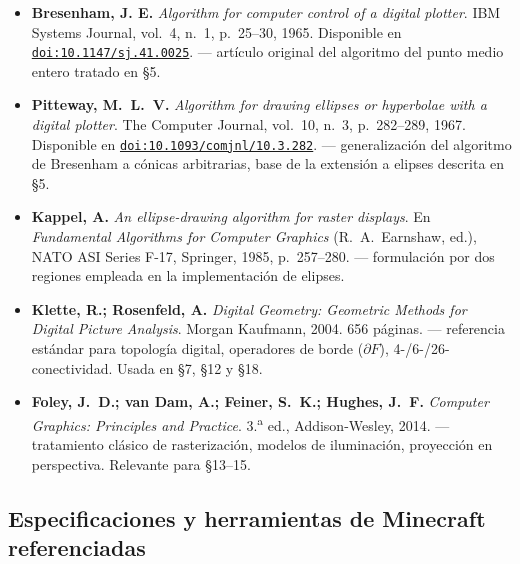 \documentclass[12pt,a4paper]{scrartcl}
\newcommand{\biblink}[2]{\href{#1}{\nolinkurl{#2}}}
\begin{document}
\begin{itemize}[leftmargin=1.4em,itemsep=0.3em,topsep=0.3em]
  \item \textbf{Bresenham, J. E.} \emph{Algorithm for computer control of a digital plotter}.
        IBM Systems Journal, vol.~4, n.~1, p.~25--30, 1965.
        Disponible en \biblink{https://doi.org/10.1147/sj.41.0025}{doi:10.1147/sj.41.0025}.
        --- artículo original del algoritmo del punto medio entero tratado en §5.

  \item \textbf{Pitteway, M.~L.~V.} \emph{Algorithm for drawing ellipses or hyperbolae
        with a digital plotter}. The Computer Journal, vol.~10, n.~3, p.~282--289, 1967.
        Disponible en \biblink{https://doi.org/10.1093/comjnl/10.3.282}{doi:10.1093/comjnl/10.3.282}.
        --- generalización del algoritmo de Bresenham a cónicas arbitrarias, base de la extensión a elipses descrita en §5.

  \item \textbf{Kappel, A.} \emph{An ellipse-drawing algorithm for raster displays}.
        En \emph{Fundamental Algorithms for Computer Graphics} (R.~A.~Earnshaw, ed.),
        NATO ASI Series F-17, Springer, 1985, p.~257--280.
        --- formulación por dos regiones empleada en la implementación de elipses.

  \item \textbf{Klette, R.; Rosenfeld, A.} \emph{Digital Geometry: Geometric Methods
        for Digital Picture Analysis}. Morgan Kaufmann, 2004. 656 páginas.
        --- referencia estándar para topología digital, operadores de borde ($\partial F$), 4-/6-/26-conectividad. Usada en §7, §12 y §18.

  \item \textbf{Foley, J.~D.; van Dam, A.; Feiner, S.~K.; Hughes, J.~F.}
        \emph{Computer Graphics: Principles and Practice}. 3.\textsuperscript{a} ed., Addison-Wesley, 2014.
        --- tratamiento clásico de rasterización, modelos de iluminación, proyección en perspectiva. Relevante para §13--15.
\end{itemize}

\subsection*{Especificaciones y herramientas de Minecraft referenciadas}
\end{document}
